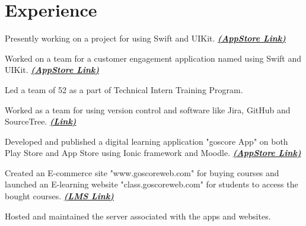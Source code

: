 \documentclass[]{deedy-resume-openfont}
\begin{document}
\begin{minipage}[t]{0.66\textwidth} 


\section{Experience}

\sectionsep
\begin{tightemize}
\item Presently working on a project for  using Swift and UIKit.  \href{https://apps.apple.com/in/app/tanishq-a-tata-product/id1494086207}{\bf {\footnotesize \textit{\textbf{(AppStore Link) }}}}
\item Worked on a team for a  customer engagement application named  using Swift and UIKit. \href{https://apps.apple.com/in/app/capitastar-work-india/id1565264581}{\bf {\footnotesize \textit{\textbf{(AppStore Link) }}}}
\item Led a team of 52 as a part of Technical Intern Training Program.
\item Worked as a team for  using version control and software like Jira, GitHub and SourceTree.
\href{https://apps.apple.com/in/app/titan-world/id1351637761}{\bf {\footnotesize \textit{\textbf{(Link) }}}}
\end{tightemize}
\sectionsep

\begin{tightemize}
\item Developed and published a digital learning application "goscore App" on both Play Store and App Store using Ionic framework and Moodle. \href{https://apps.apple.com/in/app/goscore-app/id1608910579?uo=2}{\bf {\footnotesize \textit{\textbf{(AppStore Link) }}}}
\item Created an E-commerce site "www.goscoreweb.com" for buying courses and launched an E-learning website "class.goscoreweb.com" for students to access the bought courses.  \href{https://class.goscoreweb.com/}{\bf {\footnotesize \textit{\textbf{(LMS Link) }}}}
\item Hosted and maintained the server associated with the apps and websites.
\end{tightemize}
\sectionsep


\end{minipage}
\end{document}
